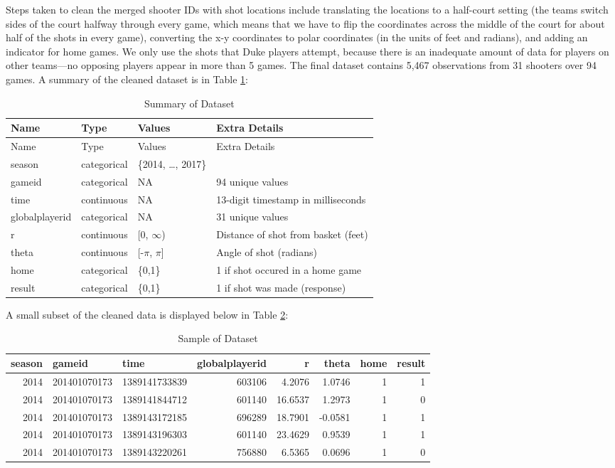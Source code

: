 \documentclass[12pt,twoside]{dukestatscithesis}
\theoremstyle{definition}
\theoremstyle{definition}
\theoremstyle{definition}
\theoremstyle{remark}
\begin{document}
Steps taken to clean the merged shooter IDs with shot locations include
translating the locations to a half-court setting (the teams switch
sides of the court halfway through every game, which means that we have
to flip the coordinates across the middle of the court for about half of
the shots in every game), converting the x-y coordinates to polar
coordinates (in the units of feet and radians), and adding an indicator
for home games. We only use the shots that Duke players attempt, because
there is an inadequate amount of data for players on other teams---no
opposing players appear in more than 5 games. The final dataset contains
5,467 observations from 31 shooters over 94 games. A summary of the
cleaned dataset is in Table \ref{tab:summarytable}:
\begin{longtable}[]{@{}llll@{}}
\caption{\label{tab:summarytable}Summary of Dataset}\tabularnewline
\toprule
Name & Type & Values & Extra Details\tabularnewline
\midrule
\endfirsthead
\toprule
Name & Type & Values & Extra Details\tabularnewline
\midrule
\endhead
season & categorical & \{2014, \ldots{}, 2017\} &\tabularnewline
gameid & categorical & NA & 94 unique values\tabularnewline
time & continuous & NA & 13-digit timestamp in
milliseconds\tabularnewline
globalplayerid & categorical & NA & 31 unique values\tabularnewline
r & continuous & {[}0, \(\infty\)) & Distance of shot from basket
(feet)\tabularnewline
theta & continuous & {[}-\(\pi\), \(\pi\){]} & Angle of shot
(radians)\tabularnewline
home & categorical & \{0,1\} & 1 if shot occured in a home
game\tabularnewline
result & categorical & \{0,1\} & 1 if shot was made
(response)\tabularnewline
\bottomrule
\end{longtable}
A small subset of the cleaned data is displayed below in Table
\ref{tab:sampletable}:

\begingroup\fontsize{11}{13}\selectfont
\begin{longtable}[t]{rllrrrrr}
\caption[Data Sample]{\label{tab:sampletable}Sample of Dataset}\\
\toprule
season & gameid & time & globalplayerid & r & theta & home & result\\
\midrule
2014 & 201401070173 & 1389141733839 & 603106 & 4.2076 & 1.0746 & 1 & 1\\
2014 & 201401070173 & 1389141844712 & 601140 & 16.6537 & 1.2973 & 1 & 0\\
2014 & 201401070173 & 1389143172185 & 696289 & 18.7901 & -0.0581 & 1 & 1\\
2014 & 201401070173 & 1389143196303 & 601140 & 23.4629 & 0.9539 & 1 & 1\\
2014 & 201401070173 & 1389143220261 & 756880 & 6.5365 & 0.0696 & 1 & 0\\
\bottomrule
\end{longtable}
\endgroup{}
\end{document}
